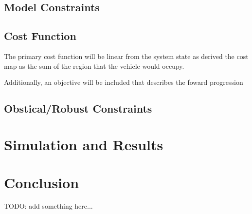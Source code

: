 \documentclass[]{IEEEtran}
\begin{document}
\subsection{Model Constraints}



\subsection{Cost Function}

The primary cost function will be linear from the system state as derived the cost map as the sum of the region that the vehicle would occupy.

Additionally, an objective will be included that describes the foward progression 





\subsection{Obstical/Robust Constraints}











\section{Simulation and Results}
\label{sec:sim_and_results}












\section{Conclusion}
TODO:
add something here...

\cite{MPC_PathTracking} %



{} 

\end{document}
